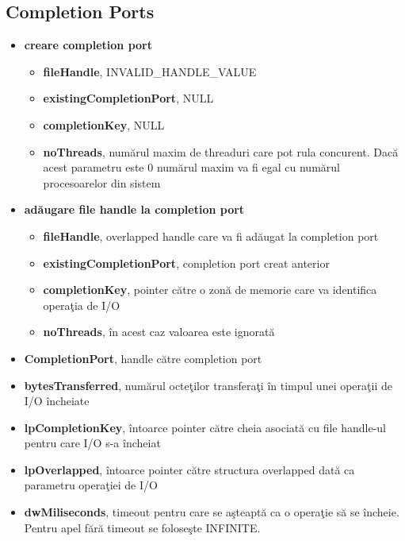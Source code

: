 \documentclass{refcard.cs.pub.ro}
\begin{document}
\begin{multicols*}{3}
\subsection{Completion Ports}
\begin{itemize}
\item \textbf{creare completion port}
\begin{itemize}
\item \textbf{fileHandle}, INVALID_HANDLE_VALUE
\item \textbf{existingCompletionPort}, NULL
\item \textbf{completionKey}, NULL
\item \textbf{noThreads}, numărul maxim de threaduri care pot rula concurent. Dacă acest parametru este 0
numărul maxim va fi egal cu numărul procesoarelor din sistem
\end{itemize}
\item \textbf{adăugare file handle la completion port}
\begin{itemize}
\item \textbf{fileHandle}, overlapped handle care va fi adăugat la completion port
\item \textbf{existingCompletionPort}, completion port creat anterior
\item \textbf{completionKey}, pointer către o zonă de memorie care va identifica operaţia de I/O 
\item \textbf{noThreads}, în acest caz valoarea este ignorată
\end{itemize}
\end{itemize}
\begin{itemize}
\item \textbf{CompletionPort}, handle către completion port
\item \textbf{bytesTransferred}, numărul octeţilor transferaţi în timpul unei operaţii de I/O încheiate
\item \textbf{lpCompletionKey}, întoarce pointer către cheia asociată cu file handle-ul pentru care I/O s-a încheiat
\item \textbf{lpOverlapped}, întoarce pointer către structura overlapped dată ca parametru operaţiei de I/O
\item \textbf{dwMiliseconds}, timeout pentru care se aşteaptă ca o operaţie să se încheie. Pentru apel fără timeout se foloseşte INFINITE.
\end{itemize}

\end{multicols*}
\end{document}
